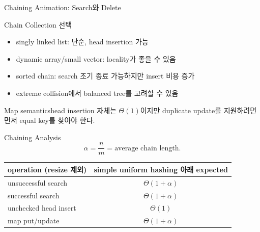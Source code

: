 \begin{frame}{Chaining Animation: Search와 Delete}
\centering{}
\end{frame}
\begin{frame}{Chain Collection 선택}
\begin{itemize}
\item singly linked list: 단순, head insertion 가능
\item dynamic array/small vector: locality가 좋을 수 있음
\item sorted chain: search 조기 종료 가능하지만 insert 비용 증가
\item extreme collision에서 balanced tree를 고려할 수 있음
\end{itemize}
\begin{alertblock}{Map semantics}head insertion 자체는 $\Theta(1)$이지만 duplicate update를 지원하려면 먼저 equal key를 찾아야 한다.\end{alertblock}
\end{frame}
\begin{frame}{Chaining Analysis}
\[
\alpha=\frac{n}{m}=\text{average chain length}.
\]
\small\centering\begin{tabular}{lc}\toprule
operation (resize 제외)&simple uniform hashing 아래 expected\\\midrule
unsuccessful search&$\Theta(1+\alpha)$\\
successful search&$\Theta(1+\alpha)$\\
unchecked head insert&$\Theta(1)$\\
map put/update&$\Theta(1+\alpha)$\\\bottomrule
\end{tabular}
\end{frame}
